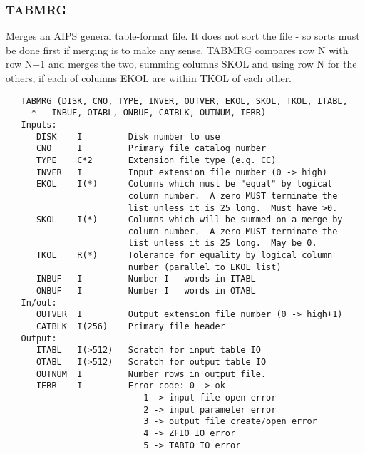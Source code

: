 \subsubsection{TABMRG}
Merges an AIPS general table-format file.  It does not sort
the file - so sorts must be done first if merging is to make any
sense.  TABMRG compares row N with row N+1 and merges the two,
summing columns SKOL and using row N for the others, if each of
columns EKOL are within TKOL of each other.
\begin{verbatim}
   TABMRG (DISK, CNO, TYPE, INVER, OUTVER, EKOL, SKOL, TKOL, ITABL,
     *   INBUF, OTABL, ONBUF, CATBLK, OUTNUM, IERR)
   Inputs:
      DISK    I         Disk number to use
      CNO     I         Primary file catalog number
      TYPE    C*2       Extension file type (e.g. CC)
      INVER   I         Input extension file number (0 -> high)
      EKOL    I(*)      Columns which must be "equal" by logical
                        column number.  A zero MUST terminate the
                        list unless it is 25 long.  Must have >0.
      SKOL    I(*)      Columns which will be summed on a merge by
                        column number.  A zero MUST terminate the
                        list unless it is 25 long.  May be 0.
      TKOL    R(*)      Tolerance for equality by logical column
                        number (parallel to EKOL list)
      INBUF   I         Number I   words in ITABL
      ONBUF   I         Number I   words in OTABL
   In/out:
      OUTVER  I         Output extension file number (0 -> high+1)
      CATBLK  I(256)    Primary file header
   Output:
      ITABL   I(>512)   Scratch for input table IO
      OTABL   I(>512)   Scratch for output table IO
      OUTNUM  I         Number rows in output file.
      IERR    I         Error code: 0 -> ok
                           1 -> input file open error
                           2 -> input parameter error
                           3 -> output file create/open error
                           4 -> ZFIO IO error
                           5 -> TABIO IO error
\end{verbatim}

